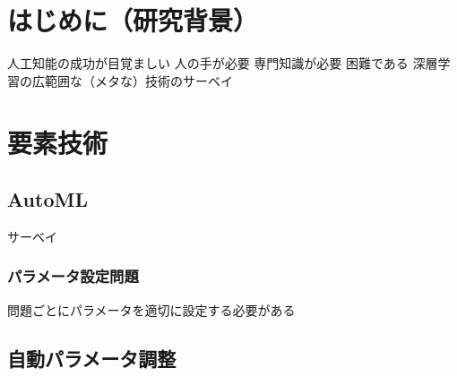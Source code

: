 \documentclass[twocolumn]{jarticle}     %
\begin{document}




\section{はじめに（研究背景）}
人工知能の成功が目覚ましい
人の手が必要
専門知識が必要
困難である
深層学習の広範囲な（メタな）技術のサーベイ


\section{要素技術}
\subsection{AutoML}
サーベイ\cite{SurveyAutoML}
\subsubsection{パラメータ設定問題}
問題ごとにパラメータを適切に設定する必要がある
\subsection{自動パラメータ調整}
\end{document}
